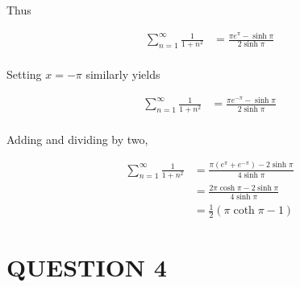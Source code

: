 \documentclass[a4paper]{article}
\begin{document}
Thus

\begin{align*}
\sum_{n=1}^{\infty} \frac{1}{1+n^{2}} & = \frac{\pi e^{\pi} - \sinh \pi }{2 \sinh \pi} \\
\end{align*}

Setting $ x = -\pi $ similarly yields

\begin{align*}
\sum_{n=1}^{\infty} \frac{1}{1+n^{2}} & = \frac{\pi e^{-\pi} - \sinh \pi }{2 \sinh \pi} \\
\end{align*}

Adding and dividing by two, 

\begin{align*}
\sum_{n=1}^{\infty} \frac{1}{1+n^{2}} & = \frac{\pi (e^{\pi} + e^{-\pi}) - 2 \sinh \pi }{4 \sinh \pi} \\
& = \frac{2 \pi \cosh \pi  - 2 \sinh \pi }{4 \sinh \pi} \\
& = \frac{1}{2} ( \pi \coth \pi - 1)
\end{align*}

\section{QUESTION 4}
\end{document}
